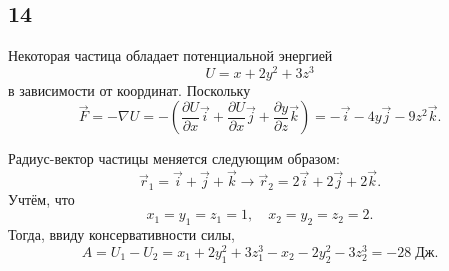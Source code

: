 \subsection{14}

Некоторая частица обладает потенциальной энергией
\[
U=x+2y^2+3z^3
\]
в зависимости от координат. Поскольку
\[
\vec F=-\nabla U=-\left(\frac{\partial U}{\partial x}\vec i+\frac{\partial U}{\partial x}\vec j+\frac{\partial y}{\partial z}\vec k\right)=-\vec i-4y\vec j-9z^2\vec k.
\]

Радиус-вектор частицы меняется следующим образом:
\[
\vec r_1=\vec i+\vec j+\vec k\longrightarrow \vec r_2=2\vec i+2\vec j+2\vec k.
\]
Учтём, что
\[
x_1=y_1=z_1=1,\quad x_2=y_2=z_2=2.
\]
Тогда, ввиду консервативности силы,
\[
A=U_1-U_2=x_1+2y_1^2+3z_1^3-x_2-2y_2^2-3z_2^3=-28\;\text{Дж}.
\]